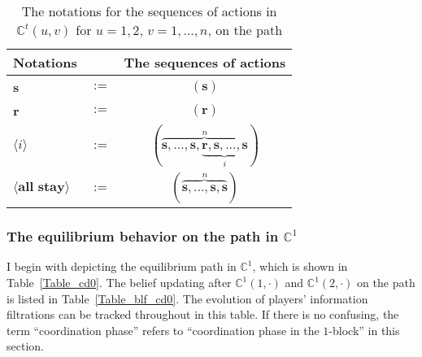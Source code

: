 \documentclass[12pt,letter]{article}
\newcommand{\Kappa}{\mathbb{C}}
\theoremstyle{definition}
\theoremstyle{definition}
\theoremstyle{remark}
\theoremstyle{claim}
\begin{document}
\begin{table}[!htbp]
\caption{The notations for the sequences of actions in $\Kappa^t(u,v)$ for $u=1,2$, $v=1,...,n$, on the path}
\label{Table_msg_coordination}
\begin{center}
\begin{tabular}{l c c}
Notations & &The sequences of actions \\
\hline
\hline
\textbf{s} & $:=$ & $(\textbf{s})$\\
\textbf{r} & $:=$ & $(\textbf{r})$\\
$\langle i \rangle$ 				& $:=$ 			& $(\overbrace{ \textbf{s},...,\textbf{s},\underbrace{\textbf{r},\textbf{s},...,\textbf{s}}_{i}}^{n} )$  \\
$\langle \textbf{all stay} \rangle$	 					& $:=$ 			& $( \overbrace{\textbf{s},...,\textbf{s},{\textbf{s}}}^{n} )$  \\
\hline
\end{tabular}
\end{center}
\end{table}


\subsubsection{The equilibrium behavior on the path in $\Kappa^1$}
\label{sec:cd0}
I begin with depicting the equilibrium path in $\Kappa^1$, which is shown in Table~\ref{Table_cd0}. The belief updating after $\Kappa^1(1,\cdot)$ and $\Kappa^1(2,\cdot)$ on the path is listed in Table~\ref{Table_blf_cd0}. The evolution of players' information filtrations can be tracked throughout in this table. %
If there is no confusing, the term ``coordination phase'' refers to ``coordination phase in the $1$-block'' in this section.
\end{document}

